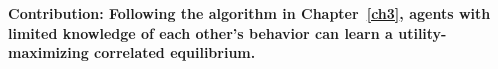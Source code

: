 







\smallskip

\noindent\textbf{Contribution: Following the algorithm in Chapter~\ref{ch3}, agents with limited knowledge of each other's behavior can learn a utility-maximizing correlated equilibrium.}


